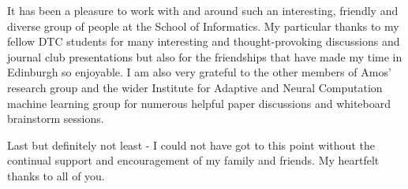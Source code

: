 It has been a pleasure to work with and around such an interesting, friendly and diverse group of people at the School of Informatics. My particular thanks to my fellow DTC students for many interesting and thought-provoking discussions and journal club presentations but also for the friendships that have made my time in Edinburgh so enjoyable. I am also very grateful to the other members of Amos' research group and the wider Institute for Adaptive and Neural Computation machine learning group for numerous helpful paper discussions and whiteboard brainstorm sessions.

Last but definitely not least - I could not have got to this point without the continual support and encouragement of my family and friends. My heartfelt thanks to all of you.

